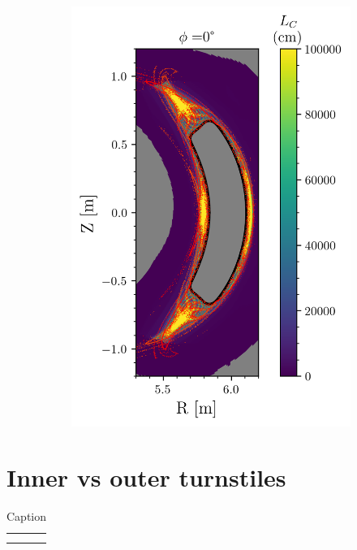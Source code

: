 \begin{figure}[H]
\begin{minipage}{0.45\textwidth}
\begin{subfigure}[b]{0.99\textwidth}
            \caption{}
            \label{fig:}
        \end{subfigure}
    \end{minipage}%
    \begin{minipage}{0.5\textwidth} %
        \centering
        \begin{subfigure}[b]{\textwidth}
            \centering
            \includegraphics[width=\textwidth]{images/w7x-gym00-1750/gym00_1750_connlength.png}
            \caption{}
            \label{fig:}
        \end{subfigure}
    \end{minipage}
    \caption{}
    \label{fig:}
\end{figure}

\section{Inner vs outer turnstiles}

\begin{table}[H]
    \centering
    \begin{tabular}{c|c}
         &  \\
         & 
    \end{tabular}
    \caption{Caption}
    \label{tab:my_label}
\end{table}